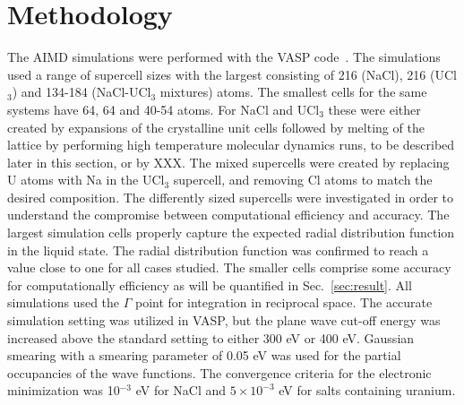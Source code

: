 \documentclass[preprint,3p,10pt,twocolumn,number,sort&compress]{elsarticle}
\begin{document}
\section{Methodology}
\label{sec:method}
The AIMD simulations were performed with the VASP code~\cite{}. The simulations used a range of supercell sizes with the largest consisting of 216 (NaCl), 216 (UCl$_3$) and 134-184 (NaCl-UCl$_3$ mixtures) atoms. The smallest cells for the same systems have 64, 64 and 40-54 atoms. For NaCl and UCl$_3$ these were either created by expansions of the crystalline unit cells followed by melting of the lattice by performing high temperature molecular dynamics runs, to be described later in this section, or by XXX. The mixed supercells were created by replacing U atoms with Na in the UCl$_3$ supercell, and removing Cl atoms to match the desired composition. 
The differently sized supercells were investigated in order to understand the compromise between computational efficiency and accuracy. The largest simulation cells properly capture the expected radial distribution function in the liquid state. The radial distribution function was confirmed to reach a value close to one for all cases studied. The smaller cells comprise some accuracy for computationally efficiency as will be quantified in Sec.~\ref{sec:result}. All simulations used the $\Gamma$ point for integration in reciprocal space. The accurate simulation setting was utilized in VASP, but the plane wave cut-off energy was increased above the standard setting to either 300 eV or 400 eV. Gaussian smearing with a smearing parameter of 0.05 eV was used for the partial occupancies of the wave functions. The convergence criteria for the electronic minimization was 10$^{-3}$ eV for NaCl and $5\times10^{-3}$ eV for salts containing uranium. 
\end{document}
